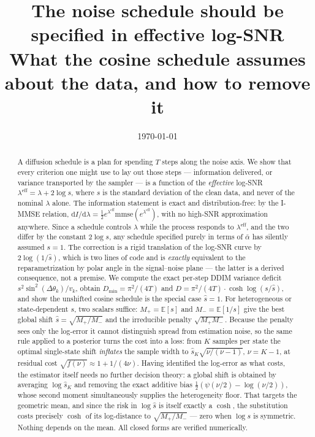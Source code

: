 \documentclass[11pt]{article}
\title{\bf The noise schedule should be specified in effective log-SNR\\
\large What the cosine schedule assumes about the data, and how to remove it}
\author{}
\date{\today}
\theoremstyle{definition}
\newcommand{\abar}{\bar\alpha}
\newcommand{\dd}{\mathrm{d}}
\newcommand{\E}{\mathbb{E}}
\newcommand{\mmse}{\mathrm{mmse}}
\newcommand{\leff}{\lambda^{\mathrm{eff}}}
\begin{document}
\maketitle
\vspace{-2.4em}

\begin{abstract}
\noindent
A diffusion schedule is a plan for spending $T$ steps along the noise axis. We
show that every criterion one might use to lay out those steps --- information
delivered, or variance transported by the sampler --- is a function of the
\emph{effective} log-SNR $\leff=\lambda+2\log s$, where $s$ is the standard
deviation of the clean data, and never of the nominal $\lambda$ alone. The
information statement is exact and distribution-free: by the I-MMSE relation,
$\dd I/\dd\lambda=\tfrac12 e^{\leff}\mmse(e^{\leff})$, with no high-SNR
approximation anywhere. Since a schedule controls $\lambda$ while the process
responds to $\leff$, and the two differ by the constant $2\log s$, any
schedule specified purely in terms of $\abar$ has silently assumed $s=1$. The
correction is a rigid translation of the log-SNR curve by $2\log(1/\hat s)$,
which is two lines of code and is \emph{exactly} equivalent to the
reparametrization by polar angle in the signal--noise plane --- the latter is a
derived consequence, not a premise. We compute the exact per-step DDIM variance
deficit $s^2\sin^2(\Delta\theta_k)/v_k$, obtain $D_{\min}=\pi^2/(4T)$ and
$D=\pi^2/(4T)\cdot\cosh\log(s/\hat s)$, and show the unshifted cosine schedule is
the special case $\hat s=1$. For heterogeneous or state-dependent $s$, two
scalars suffice: $M_+=\E[s]$ and $M_-=\E[1/s]$ give the best global shift
$\hat s=\sqrt{M_+/M_-}$ and the irreducible penalty $\sqrt{M_+M_-}$. Because the
penalty sees only the log-error it cannot distinguish spread from estimation
noise, so the same rule applied to a posterior turns the cost into a loss: from
$K$ samples per state the optimal single-state shift \emph{inflates} the sample
width to $\hat s_K\sqrt{\nu/(\nu-1)}$, $\nu=K-1$, at residual cost
$\sqrt{f(\nu)}\approx1+1/(4\nu)$. Having identified the log-error as what costs,
the estimator itself needs no further decision theory: a global shift is obtained
by averaging $\log\hat s_K$ and removing the exact additive bias
$\tfrac12(\psi(\nu/2)-\log(\nu/2))$, whose second moment simultaneously supplies
the heterogeneity floor. That targets the geometric mean, and since the risk in
$\log\hat s$ is itself exactly a $\cosh$, the substitution costs precisely
$\cosh$ of its log-distance to $\sqrt{M_+/M_-}$ --- zero when $\log s$ is
symmetric. Nothing depends on the mean. All closed forms are verified
numerically.
\end{abstract}
\end{document}

